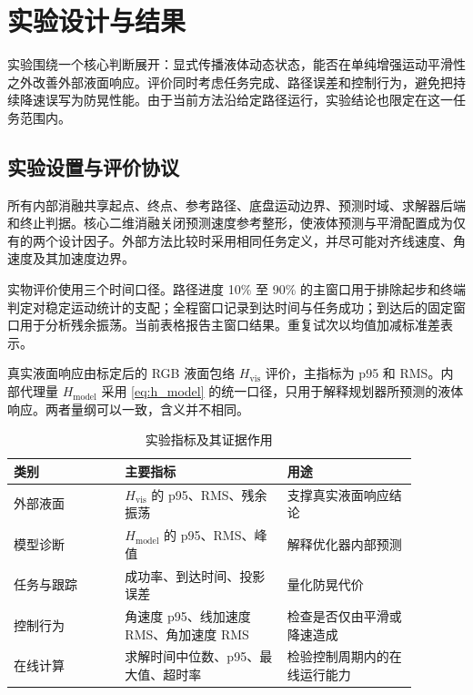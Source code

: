\section{实验设计与结果}

实验围绕一个核心判断展开：显式传播液体动态状态，能否在单纯增强运动平滑性之外改善外部液面响应。评价同时考虑任务完成、路径误差和控制行为，避免把持续降速误写为防晃性能。由于当前方法沿给定路径运行，实验结论也限定在这一任务范围内。

\subsection{实验设置与评价协议}

所有内部消融共享起点、终点、参考路径、底盘运动边界、预测时域、求解器后端和终止判据。核心二维消融关闭预测速度参考整形，使液体预测与平滑配置成为仅有的两个设计因子。外部方法比较时采用相同任务定义，并尽可能对齐线速度、角速度及其加速度边界。

实物评价使用三个时间口径。路径进度 10\% 至 90\% 的主窗口用于排除起步和终端判定对稳定运动统计的支配；全程窗口记录到达时间与任务成功；到达后的固定窗口用于分析残余振荡。当前表格报告主窗口结果。重复试次以均值加减标准差表示。

真实液面响应由标定后的 RGB 液面包络 $H_{\mathrm{vis}}$ 评价，主指标为 p95 和 RMS。内部代理量 $H_{\mathrm{model}}$ 采用 \cref{eq:h_model} 的统一口径，只用于解释规划器所预测的液体响应。两者量纲可以一致，含义并不相同。

\begin{table}[t]
  \centering
  \footnotesize
  \setlength{\tabcolsep}{3pt}
  \renewcommand{\arraystretch}{1.08}
  \caption{实验指标及其证据作用}
  \label{tab:metrics_plan}
  \begin{tabular}{p{0.24\linewidth} p{0.35\linewidth} p{0.29\linewidth}}
    \toprule
    类别 & 主要指标 & 用途 \\
    \midrule
    外部液面 & $H_{\mathrm{vis}}$ 的 p95、RMS、残余振荡 & 支撑真实液面响应结论 \\
    模型诊断 & $H_{\mathrm{model}}$ 的 p95、RMS、峰值 & 解释优化器内部预测 \\
    任务与跟踪 & 成功率、到达时间、投影误差 & 量化防晃代价 \\
    控制行为 & 角速度 p95、线加速度 RMS、角加速度 RMS & 检查是否仅由平滑或降速造成 \\
    在线计算 & 求解时间中位数、p95、最大值、超时率 & 检验控制周期内的在线运行能力 \\
    \bottomrule
  \end{tabular}
\end{table}

